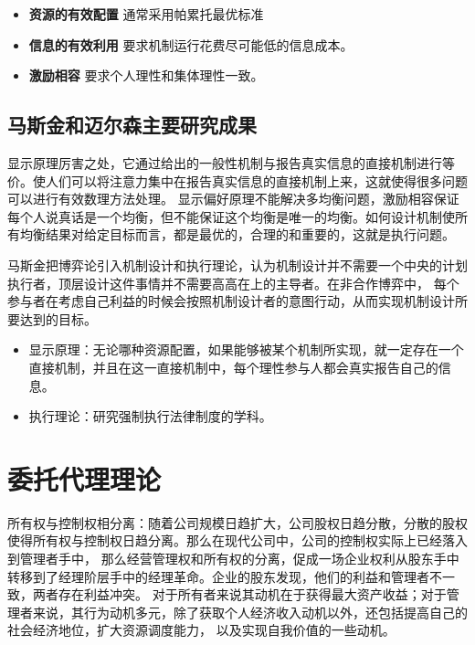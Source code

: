 \documentclass[12pt, a4paper]{article} %
\begin{document}
\begin{CJK*}{UTF8}{gbsn}
        \begin{itemize}
            \item[] \textbf{资源的有效配置} 通常采用帕累托最优标准
            \item[] \textbf{信息的有效利用} 要求机制运行花费尽可能低的信息成本。
            \item[] \textbf{激励相容} 要求个人理性和集体理性一致。
        \end{itemize}

        \subsection{马斯金和迈尔森主要研究成果}
        显示原理厉害之处，它通过给出的一般性机制与报告真实信息的直接机制进行等价。使人们可以将注意力集中在报告真实信息的直接机制上来，这就使得很多问题可以进行有效数理方法处理。
        显示偏好原理不能解决多均衡问题，激励相容保证每个人说真话是一个均衡，但不能保证这个均衡是唯一的均衡。如何设计机制使所有均衡结果对给定目标而言，都是最优的，合理的和重要的，这就是执行问题。\par

        马斯金把博弈论引入机制设计和执行理论，认为机制设计并不需要一个中央的计划执行者，顶层设计这件事情并不需要高高在上的主导者。在非合作博弈中，
        每个参与者在考虑自己利益的时候会按照机制设计者的意图行动，从而实现机制设计所要达到的目标。


        \begin{itemize}
            \item 显示原理：无论哪种资源配置，如果能够被某个机制所实现，就一定存在一个直接机制，并且在这一直接机制中，每个理性参与人都会真实报告自己的信息。
            \item 执行理论：研究强制执行法律制度的学科。
        \end{itemize}

        \clearpage
        \section{委托代理理论}
        所有权与控制权相分离：随着公司规模日趋扩大，公司股权日趋分散，分散的股权使得所有权与控制权日趋分离。那么在现代公司中，公司的控制权实际上已经落入到管理者手中，
        那么经营管理权和所有权的分离，促成一场企业权利从股东手中转移到了经理阶层手中的经理革命。企业的股东发现，他们的利益和管理者不一致，两者存在利益冲突。
        对于所有者来说其动机在于获得最大资产收益；对于管理者来说，其行为动机多元，除了获取个人经济收入动机以外，还包括提高自己的社会经济地位，扩大资源调度能力，
        以及实现自我价值的一些动机。\par


\end{CJK*}
\end{document}
